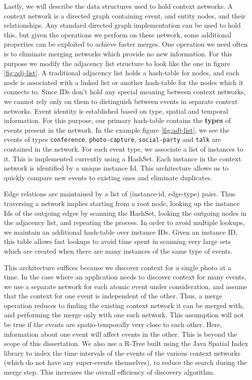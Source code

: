 Lastly, we will describe the data structures used to hold context networks. A context network is a directed graph containing event, and entity nodes, and their relationships. Any standard directed graph implementation can be used to hold this, but given the operations we perform on these network, some additional properties can be exploited to achieve faster merges. One operation we need often is to eliminate merging networks which provide no new information. For this purpose we modify the adjacency list structure to look like the one in figure \ref{fig:adj-list}. A traditional adjacency list holds a hash-table for nodes, and each node is associated with a linked list or another hash-table for the nodes which it connects to. Since IDs don't hold any special meaning between context networks, we cannot rely only on them to distinguish between events in separate context networks. Event identity is established based on type, spatial and temporal information. For this purpose, our primary hash-table contains the \textbf{types} of events present in the network. In the example figure \ref{fig:adj-list}, we see the events of types \texttt{conference}, \texttt{photo-capture}, \texttt{social-party} and \texttt{talk} are contained in the network. For each event type, we associate a list of instances to it. This is implemented currently using a HashSet. Each instance in the context network is identified by a unique instance Id. This architecture allows us to quickly compare new events to existing ones and eliminate duplicates. 

Edge relations are maintained by a list of (instance-id, edge-type) pairs. Thus traversing a network implies starting from a root node, looking up the instance Ids of the outgoing edges by scanning the HashSet, looking the outgoing nodes in the adjacency list, and repeating the process. In order to avoid multiple lookups, we maintain an additional hash-table over instance IDs. Given an instance ID, this table allows fast lookups to avoid time spent in scanning very large sets which are created when there are many instances of the same type of events.

This architecture suffices because we discover context for a single photo at a time. In the case where an application needs to discover context for many events, we use a separate network for each atomic event under consideration, and assume that the context for one event is independent of the other. Thus, a merge operation reduces to finding the existing context network it can be merged with, and performing the merge only with one such network. This assumption will not be true if the events are spatio-temporally very close to each other. Here, information about one event will affect events in the other. This is beyond the scope of this dissertation. We also use a R-Tree built using the Java Spatial Index library to index the time intervals of the events of the various context networks (which do not have any super-events themselves), to reduce the search during the merge step. This increases the overall efficiency of discovery algorithm.

